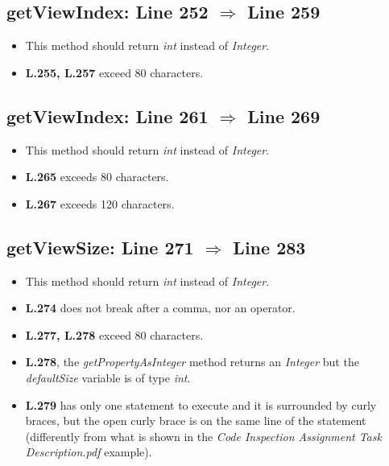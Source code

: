 \subsection{getViewIndex: Line 252 $\Rightarrow$ Line 259}
\begin{itemize}
	\item This method should return \textit{int} instead of \textit{Integer}.
	\item \textbf{L.255, L.257} exceed 80 characters.
\end{itemize}

\subsection{getViewIndex: Line 261 $\Rightarrow$ Line 269}
\begin{itemize}
	\item This method should return \textit{int} instead of \textit{Integer}.
	\item \textbf{L.265} exceeds 80 characters.
	\item \textbf{L.267} exceeds 120 characters.
\end{itemize}

\subsection{getViewSize: Line 271 $\Rightarrow$ Line 283}
\begin{itemize}
	\item This method should return \textit{int} instead of \textit{Integer}.
	\item \textbf{L.274} does not break after a comma, nor an operator.
	\item \textbf{L.277, L.278} exceed 80 characters.
	\item \textbf{L.278}, the \textit{getPropertyAsInteger} method returns an \textit{Integer} but the \textit{defaultSize} variable is of type \textit{int}.
	\item \textbf{L.279} has only one statement to execute and it is surrounded by curly braces, but the open curly brace is on the same line of the statement (differently from what is shown in the \textit{Code Inspection Assignment Task Description.pdf} example).
\end{itemize}